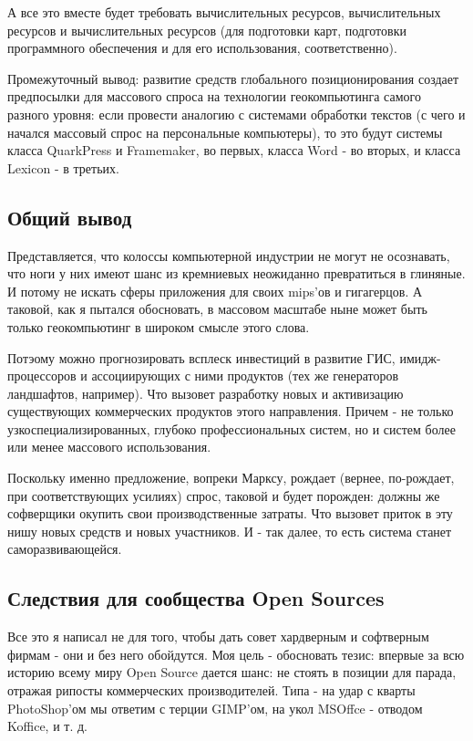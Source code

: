 А все это вместе будет требовать вычислительных ресурсов, вычислительных ресурсов и вычислительных ресурсов (для подготовки карт, подготовки программного обеспечения и для его использования, соответственно).

Промежуточный вывод: развитие средств глобального позиционирования создает предпосылки для массового спроса на технологии геокомпьютинга самого разного уровня: если провести аналогию с системами обработки текстов (с чего и начался массовый спрос на персональные компьютеры), то это будут системы класса QuarkPress и Framemaker, во первых, класса Word - во вторых, и класса Lexicon - в третьих.

\subsection{Общий вывод}

Представляется, что колоссы компьютерной индустрии не могут не осознавать, что ноги у них имеют шанс из кремниевых неожиданно превратиться в глиняные. И потому не искать сферы приложения для своих mips'ов и гигагерцов. А таковой, как я пытался обосновать, в массовом масштабе ныне может быть только геокомпьютинг в широком смысле этого слова.

Потэому можно прогнозировать всплеск инвестиций в развитие ГИС, имидж-процессоров и ассоциирующих с ними продуктов (тех же генераторов ландшафтов, например). Что вызовет разработку новых и активизацию существующих коммерческих продуктов этого направления. Причем - не только узкоспециализированных, глубоко профессиональных систем, но и систем более или менее массового использования.

Поскольку именно предложение, вопреки Марксу, рождает (вернее, по-рождает, при соответствующих усилиях) спрос, таковой и будет порожден: должны же софверщики окупить свои производственные затраты. Что вызовет приток в эту нишу новых средств и новых участников. И - так далее, то есть система станет саморазвивающейся.

\subsection{Следствия для сообщества Open Sources}

Все это я написал не для того, чтобы дать совет хардверным и софтверным фирмам - они и без него обойдутся. Моя цель - обосновать тезис: впервые за всю историю всему миру Open Source дается шанс: не стоять в позиции для парада, отражая рипосты коммерческих производителей. Типа - на удар с кварты PhotoShop'ом мы ответим с терции GIMP'ом, на укол MSOffce - отводом Koffice, и т. д.

